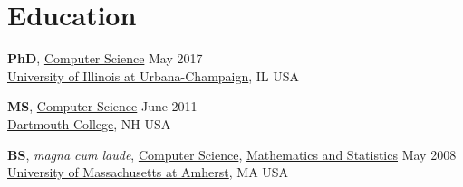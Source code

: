
\section{\sc Education}
\textbf{PhD}, {\href{http://www.cs.illinois.edu/}{Computer Science}} \hfill May 2017 \\
{\href{http://www.illinois.edu/}{University of Illinois at Urbana-Champaign}}, IL USA \\
\vspace{-0.16cm}

\textbf{MS}, {\href{http://www.cs.dartmouth.edu/}{Computer Science}} \hfill June 2011 \\
{\href{http://www.dartmouth.edu/}{Dartmouth College}}, NH USA \\
\vspace{-0.16cm}

\textbf{BS}, \emph{magna cum laude}, {\href{http://www.cs.umass.edu/}{Computer Science}}, {\href{http://www.math.umass.edu/}{Mathematics and Statistics}}
 \hfill May 2008 \\
{\href{http://www.umass.edu/}{University of Massachusetts at Amherst}}, MA USA



%
%
